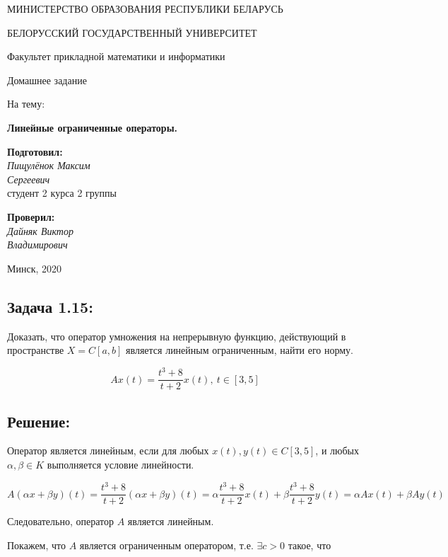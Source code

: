 \documentclass[12pt, a4paper]{report}
\begin{document}
\begin{titlepage}
    
    \bigskip
    \centerline{\large МИНИСТЕРСТВО ОБРАЗОВАНИЯ РЕСПУБЛИКИ БЕЛАРУСЬ}
    \bigskip
    \centerline{\large БЕЛОРУССКИЙ ГОСУДАРСТВЕННЫЙ УНИВЕРСИТЕТ}
    \bigskip
    \centerline{\large Факультет прикладной математики и информатики}
    \vfill
    \vfill
    \vfill
    \centerline{\LARGE Домашнее задание}
    \bigskip
    \bigskip
    \centerline{\large На тему:}
    \centerline{\large \bf \sc Линейные ограниченные операторы.}
    \bigskip
    \vfill
    \vfill
    \hfill
    \begin{minipage}{0.3\textwidth}
        {\large{\bf Подготовил:} \\
        {\it Пищулёнок Максим \\ Сергеевич}\\
        {студент 2 курса 2 группы}}
    \end{minipage}
    \vfill
    \hfill
    \begin{minipage}{0.3\textwidth}
      {\large{\bf Проверил:} \\
    {\it Дайняк Виктор \\ Владимирович}}
    \end{minipage}
    \vfill
    \vfill
    \centerline{\large Минск, 2020}
\end{titlepage}


\subsection*{Задача 1.15:}
Доказать, что оператор умножения на непрерывную функцию, действующий в пространстве $X=C[a, b]$ является линейным ограниченным, найти его норму.

\[Ax(t) = \frac{t^3 + 8}{t+2}x(t),\ t\in [3, 5]\]

\subsection*{Решение:}
Оператор является линейным, если для любых $x(t), y(t)\in C[3, 5]$, и любых $\alpha, \beta \in K$ выполняется условие линейности.

\[A(\alpha x + \beta y) (t) = \frac{t^3 + 8}{t + 2}(\alpha x + \beta y)(t) = 
\alpha \frac{t^3 + 8}{t + 2}x(t) + \beta\frac{t^3+8}{t + 2}y(t) = 
\alpha A x(t) + \beta A y(t)\]

Следовательно, оператор $A$ является линейным.

Покажем, что $A$ является ограниченным оператором, т.е. $\exists c > 0$ такое, что
\end{document}
